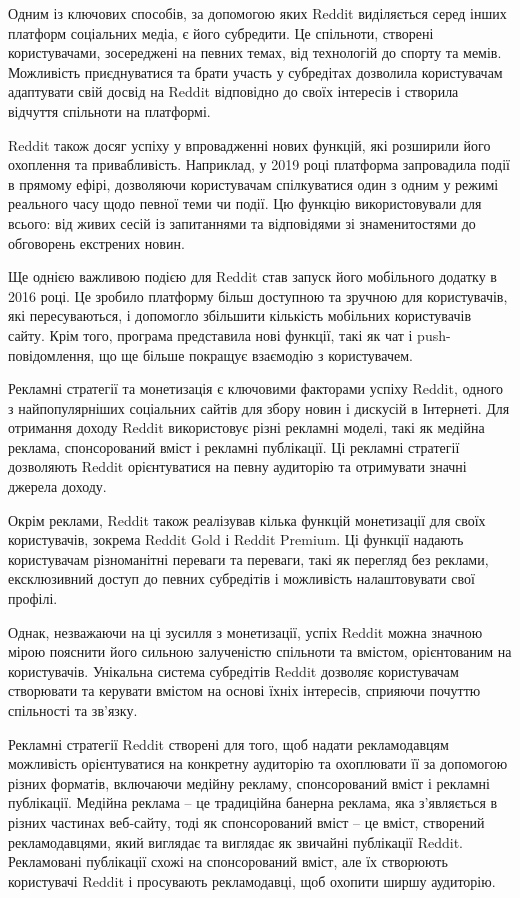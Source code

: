 \documentclass[oneside,14pt]{extarticle}
\begin{document}
Одним із ключових способів, за допомогою яких Reddit виділяється серед інших платформ соціальних медіа, є його субредити. Це спільноти, створені користувачами, зосереджені на певних темах, від технологій до спорту та мемів. Можливість приєднуватися та брати участь у субредітах дозволила користувачам адаптувати свій досвід на Reddit відповідно до своїх інтересів і створила відчуття спільноти на платформі.

Reddit також досяг успіху у впровадженні нових функцій, які розширили його охоплення та привабливість. Наприклад, у 2019 році платформа запровадила події в прямому ефірі, дозволяючи користувачам спілкуватися один з одним у режимі реального часу щодо певної теми чи події. Цю функцію використовували для всього: від живих сесій із запитаннями та відповідями зі знаменитостями до обговорень екстрених новин.

Ще однією важливою подією для Reddit став запуск його мобільного додатку в 2016 році. Це зробило платформу більш доступною та зручною для користувачів, які пересуваються, і допомогло збільшити кількість мобільних користувачів сайту. Крім того, програма представила нові функції, такі як чат і push-повідомлення, що ще більше покращує взаємодію з користувачем.

Рекламні стратегії та монетизація є ключовими факторами успіху Reddit, одного з найпопулярніших соціальних сайтів для збору новин і дискусій в Інтернеті. Для отримання доходу Reddit використовує різні рекламні моделі, такі як медійна реклама, спонсорований вміст і рекламні публікації. Ці рекламні стратегії дозволяють Reddit орієнтуватися на певну аудиторію та отримувати значні джерела доходу.

Окрім реклами, Reddit також реалізував кілька функцій монетизації для своїх користувачів, зокрема Reddit Gold і Reddit Premium. Ці функції надають користувачам різноманітні переваги та переваги, такі як перегляд без реклами, ексклюзивний доступ до певних субредітів і можливість налаштовувати свої профілі.

Однак, незважаючи на ці зусилля з монетизації, успіх Reddit можна значною мірою пояснити його сильною залученістю спільноти та вмістом, орієнтованим на користувачів. Унікальна система субредітів Reddit дозволяє користувачам створювати та керувати вмістом на основі їхніх інтересів, сприяючи почуттю спільності та зв’язку.

Рекламні стратегії Reddit створені для того, щоб надати рекламодавцям можливість орієнтуватися на конкретну аудиторію та охоплювати її за допомогою різних форматів, включаючи медійну рекламу, спонсорований вміст і рекламні публікації. Медійна реклама – це традиційна банерна реклама, яка з’являється в різних частинах веб-сайту, тоді як спонсорований вміст – це вміст, створений рекламодавцями, який виглядає та виглядає як звичайні публікації Reddit. Рекламовані публікації схожі на спонсорований вміст, але їх створюють користувачі Reddit і просувають рекламодавці, щоб охопити ширшу аудиторію.
\end{document}
